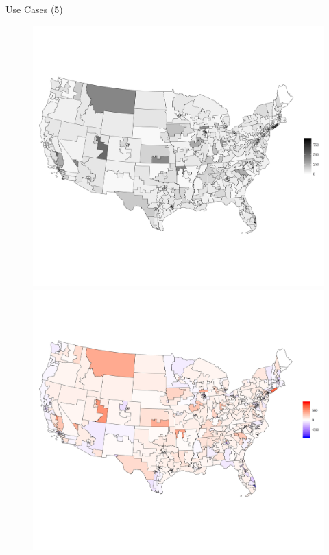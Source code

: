 \begin{frame}{Use Cases (5)}
\begin{figure}[t]
\begin{center}
\vspace{-.5cm}
\hspace*{-0.8cm}
	\includegraphics[scale=.17]{uc_5_map_edits1.png}
\hspace*{-0.1cm}
	\includegraphics[scale=.17]{uc_5_map_edits2.png}

\end{center}
\end{figure}
\end{frame}
